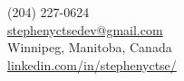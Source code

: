 {\small
  \faPhone{}\enspace{}(204) 227-0624\\[5pt] %
  \faEnvelope{}\enspace{}\href{mailto:stephenyctsedev@gmail.com}{\color{white}stephenyctsedev@gmail.com}\\[5pt]
  \faMapMarker{}\enspace{}Winnipeg, Manitoba, Canada\\[5pt]
  \faLinkedin{}\enspace{}\href{https://www.linkedin.com/in/stephenyctse/}{\color{white}linkedin.com/in/stephenyctse/}%
}
\par\vspace{5pt}
